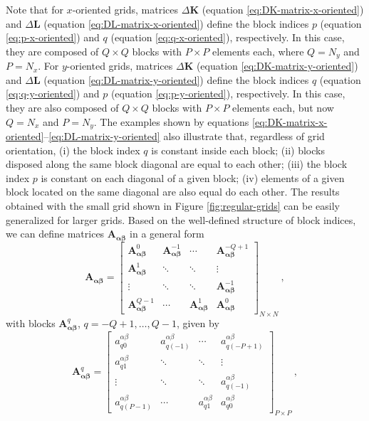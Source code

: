 \documentclass[manuscript,noblind]{geophysics}
\begin{document}
Note that for $x$-oriented grids, matrices $\Delta\mathbf{K}$ (equation \ref{eq:DK-matrix-x-oriented})
and $\Delta\mathbf{L}$ (equation \ref{eq:DL-matrix-x-oriented}) define the block indices
$p$ (equation \ref{eq:p-x-oriented}) and $q$ (equation \ref{eq:q-x-oriented}), respectively.
In this case, they are composed of $Q \times Q$ blocks with $P \times P$ elements each, where 
$Q = N_{y}$ and $P = N_{x}$. 
For $y$-oriented grids, matrices $\Delta\mathbf{K}$ (equation \ref{eq:DK-matrix-y-oriented})
and $\Delta\mathbf{L}$ (equation \ref{eq:DL-matrix-y-oriented}) define the block indices
$q$ (equation \ref{eq:q-y-oriented}) and $p$ (equation \ref{eq:p-y-oriented}), respectively.
In this case, they are also composed of $Q \times Q$ blocks with $P \times P$ elements each, 
but now $Q = N_{x}$ and $P = N_{y}$.
The examples shown by equations \ref{eq:DK-matrix-x-oriented}--\ref{eq:DL-matrix-y-oriented}
also illustrate that, regardless of grid orientation, (i) the block index $q$ is constant 
inside each block; (ii) blocks disposed along the same block diagonal are equal to each other; 
(iii) the block index $p$ is constant on each diagonal of a given block; 
(iv) elements of a given block located on the same diagonal are also equal do each other.
The results obtained with the small grid shown in Figure \ref{fig:regular-grids}
can be easily generalized for larger grids.
Based on the well-defined structure of block indices, we can define 
matrices $\mathbf{A_{\boldsymbol{\alpha\beta}}}$ in a general form
\begin{equation}
	\mathbf{A}_{\boldsymbol{\alpha\beta}} = \begin{bmatrix}
		\mathbf{A}_{\boldsymbol{\alpha\beta}}^{0}   & \mathbf{A}_{\boldsymbol{\alpha\beta}}^{-1} & \cdots          & \mathbf{A}_{\boldsymbol{\alpha\beta}}^{-Q+1} \\
		\mathbf{A}_{\boldsymbol{\alpha\beta}}^{1}   & \ddots          & \ddots          & \vdots           \\ 
		\vdots           & \ddots          & \ddots          & \mathbf{A}_{\boldsymbol{\alpha\beta}}^{-1}   \\
		\mathbf{A}_{\boldsymbol{\alpha\beta}}^{Q-1} & \cdots          & \mathbf{A}_{\boldsymbol{\alpha\beta}}^{1}  & \mathbf{A}_{\boldsymbol{\alpha\beta}}^{0}
	\end{bmatrix}_{N \times N} \: ,
	\label{eq:BTTB_A_alpha_beta}
\end{equation}
with blocks $\mathbf{A}_{\boldsymbol{\alpha\beta}}^{q}$, $q = -Q+1, \dots, Q-1$, given by
\begin{equation}
	\mathbf{A}_{\boldsymbol{\alpha\beta}}^{q} = \begin{bmatrix}
		a^{\alpha\beta}_{q0}   & a^{\alpha\beta}_{q(-1)} & \cdots  & a^{\alpha\beta}_{q(-P+1)} \\
		a^{\alpha\beta}_{q1}   & \ddots     & \ddots  & \vdots       \\ 
		\vdots      & \ddots     & \ddots  & a^{\alpha\beta}_{q(-1)}   \\
		a^{\alpha\beta}_{q(P-1)} & \cdots     & a^{\alpha\beta}_{q1}  & a^{\alpha\beta}_{q0}
	\end{bmatrix}_{P \times P} \: ,
	\label{eq:Aq_block}
\end{equation}
\end{document}
